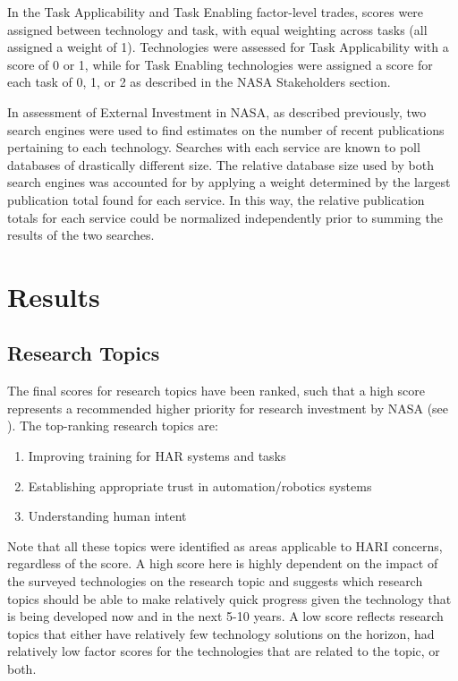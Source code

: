 In the Task Applicability and Task Enabling factor-level trades, scores were assigned between technology and task, with equal weighting across tasks (all assigned a weight of 1).
Technologies were assessed for Task Applicability with a score of 0 or 1, while for Task Enabling technologies were assigned a score for each task of 0, 1, or 2 as described in the NASA Stakeholders section.

In assessment of External Investment in NASA, as described previously, two search engines were used to find estimates on the number of recent publications pertaining to each technology.
Searches with each service are known to poll databases of drastically different size.
The relative database size used by both search engines was accounted for by applying a weight determined by the largest publication total found for each service.
In this way, the relative publication totals for each service could be normalized independently prior to summing the results of the two searches.

\section{Results}

\subsection{Research Topics}
The final scores for research topics have been ranked, such that a high score represents a recommended higher priority for research investment by NASA (see ).
The top-ranking research topics are:
\begin{enumerate}
    \item Improving training for HAR systems and tasks
	\item Establishing appropriate trust in automation/robotics systems
	\item Understanding human intent
\end{enumerate}

Note that all these topics were identified as areas applicable to HARI concerns, regardless of the score.
A high score here is highly dependent on the impact of the surveyed technologies on the research topic and suggests which research topics should be able to make relatively quick progress given the technology that is being developed now and in the next 5-10 years.
A low score reflects research topics that either have relatively few technology solutions on the horizon, had relatively low factor scores for the technologies that are related to the topic, or both.

